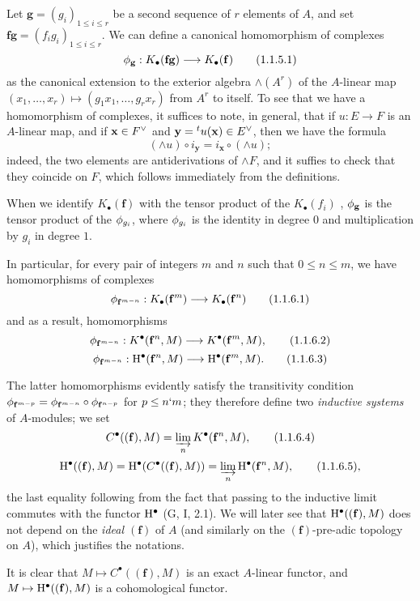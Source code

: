 \begin{env}[1.1.5]
\label{3.1.1.5}
Let $\mathbf{g}=(g_i)_{1\leq i\leq r}$ be a second sequence of $r$ elements of $A$, and set $\mathbf{f}\mathbf{g}=(f_i g_i)_{1\leq i\leq r}$.
We can define a canonical homomorphism of complexes
\[
  \vphi_\mathbf{g}:K_\bullet(\mathbf{f}\mathbf{g})\to K_\bullet(\mathbf{f})
  \tag{1.1.5.1}
\]
as the canonical extension to the exterior algebra $\wedge(A^r)$ of the $A$-linear map $(x_1,\dots,x_r)\mapsto(g_1 x_1,\dots,g_r x_r)$ from $A^r$ to itself.
To see that we have a homomorphism of complexes, it suffices to note, in general, that if $u:E\to F$ is an $A$-linear map, and if $\mathbf{x}\in{F}^\vee$ and $\mathbf{y}={}^t u(\mathbf{x})\in{E}^\vee$, then we have the formula
\[
  (\wedge u)\circ i_\mathbf{y}=i_\mathbf{x}\circ(\wedge u);
  \tag{1.1.5.2}
\]
indeed, the two elements are antiderivations of $\wedge F$, and it suffies to check that they coincide on $F$, which follows immediately from the definitions.

When we identify $K_\bullet(\mathbf{f})$ with the tensor product of the $K_\bullet(f_i)$ , $\phi_\mathbf{g}$ is the tensor product of the $\phi_{g_i}$, where $\phi_{g_i}$ is the identity in degree $0$ and multiplication by $g_i$ in degree $1$.
\end{env}

\begin{env}[1.1.6]
\label{3.1.1.6}
In particular, for every pair of integers $m$ and $n$ such that $0\leq n\leq m$, we have homomorphisms of complexes
\[
  \vphi_{\mathbf{f}^{m-n}}:K_\bullet(\mathbf{f}^m)\to K_\bullet(\mathbf{f}^n)
  \tag{1.1.6.1}
\]
and as a result, homomorphisms
\[
  \vphi_{\mathbf{f}^{m-n}}:K^\bullet(\mathbf{f}^n,M)\to K^\bullet(\mathbf{f}^m,M),
  \tag{1.1.6.2}
\]
\[
  \vphi_{\mathbf{f}^{m-n}}:\HH^\bullet(\mathbf{f}^n,M)\to\HH^\bullet(\mathbf{f}^m,M).
  \tag{1.1.6.3}
\]

The latter homomorphisms evidently satisfy the transitivity condition $\phi_{\mathbf{f}^{m-p}}=\phi_{\mathbf{f}^{m-n}}\circ\phi_{\mathbf{f}^{n-p}}$ for $p\leq n\lq m$; they therefore define two \emph{inductive systems} of $A$-modules; we set
\[
  C^\bullet((\mathbf{f}),M)=\varinjlim_n K^\bullet(\mathbf{f}^n,M),
  \tag{1.1.6.4}
\]
\[
  \mathrm{H}^\bullet((\mathbf{f}),M)=\mathrm{H}^\bullet(C^\bullet((\mathbf{f}),M))=\varinjlim_n\mathrm{H}^\bullet(\mathbf{f}^n,M),
  \tag{1.1.6.5},
\]
the last equality following from the fact that passing to the inductive limit commutes with the functor $\mathrm{H}^\bullet$ (G, I, 2.1).
We will later see  that $\mathrm{H}^\bullet((\mathbf{f}),M)$ does not depend on the \emph{ideal $(\mathbf{f})$} of $A$ (and similarly on the $(\mathbf{f})$-pre-adic topology on $A$), which justifies the notations.

It is clear that $M\mapsto C^\bullet((\mathbf{f}),M)$ is an exact $A$-linear functor, and $M\mapsto\HH^\bullet((\mathbf{f}),M)$ is a cohomological functor.
\end{env}

